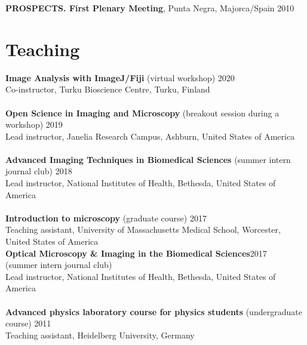 \documentclass[margin,line]{res}
\begin{document}
\begin{resume}
\vspace*{-2.5mm}
{\bf PROSPECTS. First Plenary Meeting}, Punta Negra, Majorca/Spain  \hfill 2010 %


\section{\sc Teaching}

{\bf  Image Analysis with ImageJ/Fiji} (virtual workshop)  \hfill 2020\\
Co-instructor, Turku Bioscience Centre, Turku, Finland\\
\vspace*{-3mm}\\
{\bf  Open Science in Imaging and Microscopy} (breakout session during a workshop)  \hfill 2019\\
Lead instructor, Janelia Research Campus, Ashburn, United States of America\\
\vspace*{-3mm}\\
{\bf Advanced Imaging Techniques in Biomedical Sciences} (summer intern journal club) \hfill {2018}\\
Lead instructor, National Institutes of Health, Bethesda, United States of America \\
\vspace*{-3mm}\\
{\bf Introduction to microscopy} (graduate course) \hfill {2017}\\
Teaching assistant, University of Massachusetts Medical School, Worcester, \\
United States of America\\
{\bf Optical Microscopy \& Imaging in the Biomedical Sciences}\hfill {2017}\\
 (summer intern journal club) \\
 Lead instructor, National Institutes of Health, Bethesda, United States of America \\
\vspace*{-3mm}\\
{\bf Advanced physics laboratory course for physics students} (undergraduate course) \hfill {2011}\\
Teaching assistant, Heidelberg University, Germany\\

\end{resume}
\end{document}
